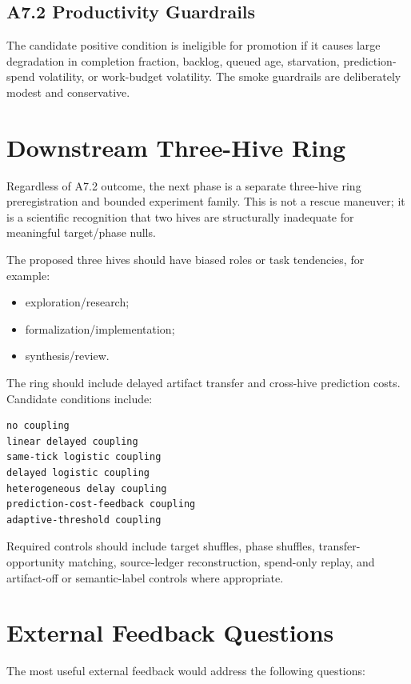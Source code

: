 \documentclass[11pt]{article}
\begin{document}
\subsection{A7.2 Productivity Guardrails}

The candidate positive condition is ineligible for promotion if it causes
large degradation in completion fraction, backlog, queued age, starvation,
prediction-spend volatility, or work-budget volatility. The smoke guardrails
are deliberately modest and conservative.

\section{Downstream Three-Hive Ring}

Regardless of A7.2 outcome, the next phase is a separate three-hive ring
preregistration and bounded experiment family. This is not a rescue maneuver;
it is a scientific recognition that two hives are structurally inadequate for
meaningful target/phase nulls.

The proposed three hives should have biased roles or task tendencies, for
example:

\begin{itemize}
\item exploration/research;
\item formalization/implementation;
\item synthesis/review.
\end{itemize}

The ring should include delayed artifact transfer and cross-hive prediction
costs. Candidate conditions include:

\begin{verbatim}
no coupling
linear delayed coupling
same-tick logistic coupling
delayed logistic coupling
heterogeneous delay coupling
prediction-cost-feedback coupling
adaptive-threshold coupling
\end{verbatim}

Required controls should include target shuffles, phase shuffles,
transfer-opportunity matching, source-ledger reconstruction, spend-only replay,
and artifact-off or semantic-label controls where appropriate.

\section{External Feedback Questions}

The most useful external feedback would address the following questions:
\end{document}
